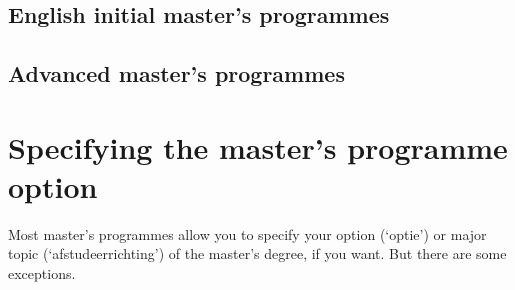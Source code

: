 \documentclass[11pt,article,oneside,british,extralanguage=dutch]{kulemt}
\newcommand\Dutch[1]{`{\selectlanguage{dutch}#1}'}
\begin{document}
\subsection*{English initial master’s programmes}

\subsection*{Advanced master’s programmes}

\section{Specifying the master's programme option}
Most master's programmes allow you to specify your option (\Dutch{optie}) or
major topic (\Dutch{afstudeerrichting}) of the master's degree, if you want.
But there are some exceptions.
\begin{itemize}
\end{itemize}



\end{document}
